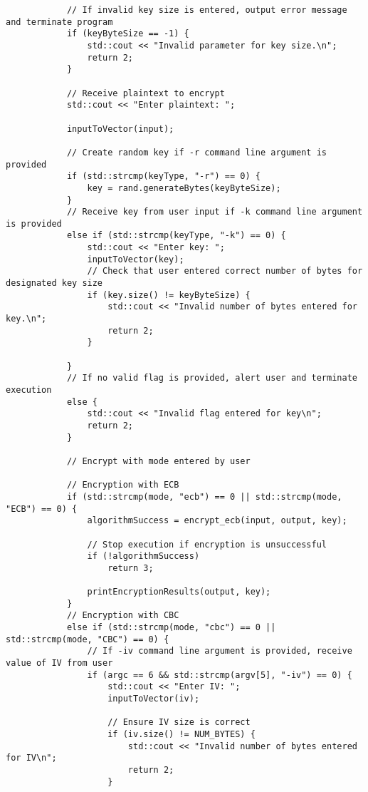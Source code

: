 \documentclass[a4paper,12pt]{article}
\begin{document}
{\begin{lstlisting}
            // If invalid key size is entered, output error message and terminate program
            if (keyByteSize == -1) {
                std::cout << "Invalid parameter for key size.\n";
                return 2;
            }

            // Receive plaintext to encrypt
            std::cout << "Enter plaintext: ";

            inputToVector(input);

            // Create random key if -r command line argument is provided
            if (std::strcmp(keyType, "-r") == 0) {
                key = rand.generateBytes(keyByteSize);
            }
            // Receive key from user input if -k command line argument is provided
            else if (std::strcmp(keyType, "-k") == 0) {
                std::cout << "Enter key: ";
                inputToVector(key);
                // Check that user entered correct number of bytes for designated key size
                if (key.size() != keyByteSize) {
                    std::cout << "Invalid number of bytes entered for key.\n";
                    return 2;
                }

            }
            // If no valid flag is provided, alert user and terminate execution
            else {
                std::cout << "Invalid flag entered for key\n";
                return 2;
            }

            // Encrypt with mode entered by user

            // Encryption with ECB
            if (std::strcmp(mode, "ecb") == 0 || std::strcmp(mode, "ECB") == 0) {
                algorithmSuccess = encrypt_ecb(input, output, key);

                // Stop execution if encryption is unsuccessful
                if (!algorithmSuccess)
                    return 3;

                printEncryptionResults(output, key);
            }
            // Encryption with CBC
            else if (std::strcmp(mode, "cbc") == 0 || std::strcmp(mode, "CBC") == 0) {
                // If -iv command line argument is provided, receive value of IV from user
                if (argc == 6 && std::strcmp(argv[5], "-iv") == 0) {
                    std::cout << "Enter IV: ";
                    inputToVector(iv);

                    // Ensure IV size is correct
                    if (iv.size() != NUM_BYTES) {
                        std::cout << "Invalid number of bytes entered for IV\n";
                        return 2;
                    }


\end{lstlisting}}
\end{document}

